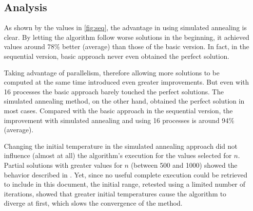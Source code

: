 \subsection{Analysis}
\label{sec:analysis}

As shown by the values in \cref{fig:seq}, the advantage in using simulated annealing is clear. By letting the algorithm follow worse solutions in the beginning, it achieved values around 78\% better (average) than those of the basic version. In fact, in the sequential version, basic approach never even obtained the perfect solution.

Taking advantage of parallelism, therefore allowing more solutions to be computed at the same time introduced even greater improvements. But even with 16 processes the basic approach barely touched the perfect solutions. The simulated annealing method, on the other hand, obtained the perfect solution in most cases. Compared with the basic approach in the sequential version, the improvement with simulated annealing and using 16 processes is around 94\% (average).

Changing the initial temperature in the simulated annealing approach did not influence (almost at all) the algorithm's execution for the values selected for $n$. Partial solutions with greater values for $n$ (between 500 and 1000) showed the behavior described in \cite{Quinn2004}. Yet, since no useful complete execution could be retrieved to include in this document, the initial range, retested using a limited number of iterations, showed that greater initial temperatures cause the algorithm to diverge at first, which slows the convergence of the method.

